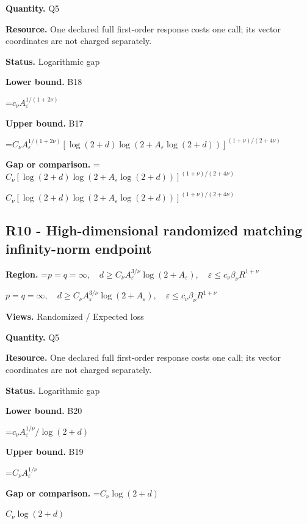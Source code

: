\documentclass[10pt,a4paper]{article}
\newcommand{\AtlasMath}[1]{\par\begingroup\centering\setbox0=\hbox{$\displaystyle #1$}\ifdim\wd0>1.4\linewidth\typeout{ATLAS WIDE FORMULA: \the\wd0}\fi\ifdim\wd0>\linewidth\resizebox{\linewidth}{!}{\box0}\else\box0\fi\par\endgroup}
\newcommand{\AtlasInlineMath}[1]{\begingroup\setbox0=\hbox{$#1$}\ifdim\wd0>.4\linewidth\endgroup\AtlasMath{#1}\else\endgroup$#1$\fi}
\begin{document}
\textbf{Quantity.} Q5



\textbf{Resource.} One declared full first-order response costs one call; its vector coordinates are not charged separately.



\textbf{Status.} Logarithmic gap



\textbf{Lower bound.} B18



\AtlasMath{c_\nu A_\varepsilon^{1/(1+2\nu)}}


\textbf{Upper bound.} B17



\AtlasMath{C_\nu A_\varepsilon^{1/(1+2\nu)}[\log(2+d)\log(2+A_\varepsilon\log(2+d))]^{(1+\nu)/(2+4\nu)}}


\textbf{Gap or comparison.} \AtlasInlineMath{C_\nu[\log(2+d)\log(2+A_\varepsilon\log(2+d))]^{(1+\nu)/(2+4\nu)}}



\subsection{R10 - High-dimensional randomized matching infinity-norm endpoint}


\textbf{Region.} \AtlasInlineMath{p=q=\infty,\quad d\ge C_\nu A_\varepsilon^{3/\nu}\log(2+A_\varepsilon),\quad\varepsilon\le c_\nu\beta_\nu R^{1+\nu}}



\textbf{Views.} Randomized / Expected loss



\textbf{Quantity.} Q5



\textbf{Resource.} One declared full first-order response costs one call; its vector coordinates are not charged separately.



\textbf{Status.} Logarithmic gap



\textbf{Lower bound.} B20



\AtlasMath{c_\nu A_\varepsilon^{1/\nu}/\log(2+d)}


\textbf{Upper bound.} B19



\AtlasMath{C_\nu A_\varepsilon^{1/\nu}}


\textbf{Gap or comparison.} \AtlasInlineMath{C_\nu\log(2+d)}
\end{document}
